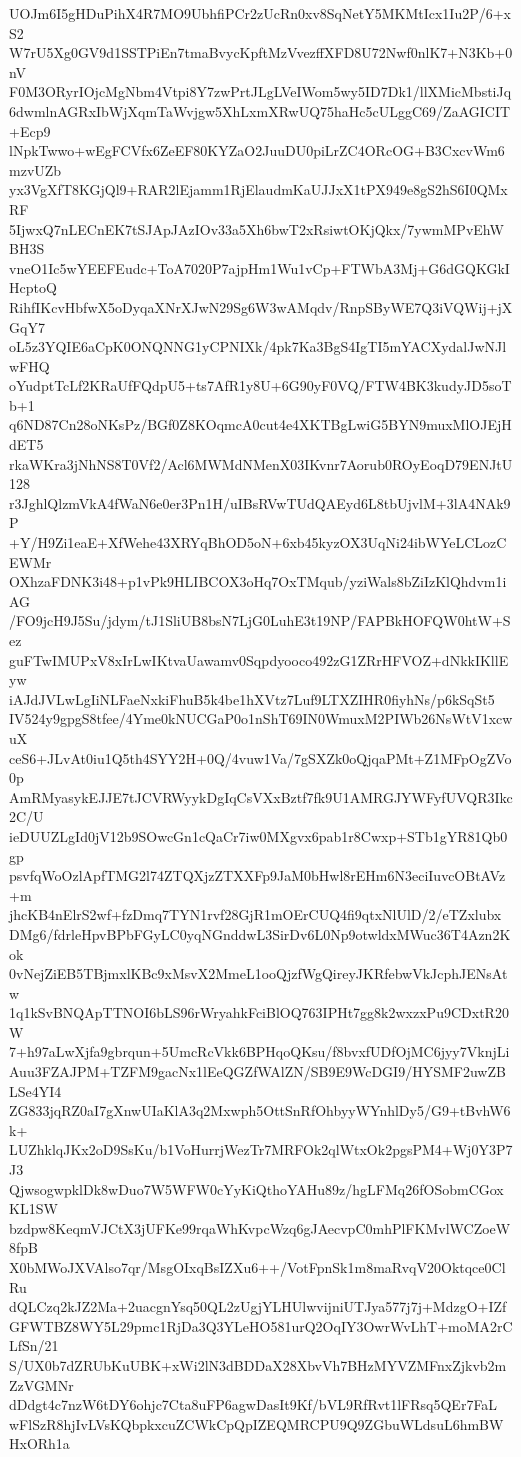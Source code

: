 UOJm6I5gHDuPihX4R7MO9UbhfiPCr2zUcRn0xv8SqNetY5MKMtIcx1Iu2P/6+xS2
W7rU5Xg0GV9d1SSTPiEn7tmaBvycKpftMzVvezffXFD8U72Nwf0nlK7+N3Kb+0nV
F0M3ORyrIOjcMgNbm4Vtpi8Y7zwPrtJLgLVeIWom5wy5ID7Dk1/llXMicMbstiJq
6dwmlnAGRxIbWjXqmTaWvjgw5XhLxmXRwUQ75haHc5cULggC69/ZaAGICIT+Ecp9
lNpkTwwo+wEgFCVfx6ZeEF80KYZaO2JuuDU0piLrZC4ORcOG+B3CxcvWm6mzvUZb
yx3VgXfT8KGjQl9+RAR2lEjamm1RjElaudmKaUJJxX1tPX949e8gS2hS6I0QMxRF
5IjwxQ7nLECnEK7tSJApJAzIOv33a5Xh6bwT2xRsiwtOKjQkx/7ywmMPvEhWBH3S
vneO1Ic5wYEEFEudc+ToA7020P7ajpHm1Wu1vCp+FTWbA3Mj+G6dGQKGkIHcptoQ
RihfIKcvHbfwX5oDyqaXNrXJwN29Sg6W3wAMqdv/RnpSByWE7Q3iVQWij+jXGqY7
oL5z3YQIE6aCpK0ONQNNG1yCPNIXk/4pk7Ka3BgS4IgTI5mYACXydalJwNJlwFHQ
oYudptTcLf2KRaUfFQdpU5+ts7AfR1y8U+6G90yF0VQ/FTW4BK3kudyJD5soTb+1
q6ND87Cn28oNKsPz/BGf0Z8KOqmcA0cut4e4XKTBgLwiG5BYN9muxMlOJEjHdET5
rkaWKra3jNhNS8T0Vf2/Acl6MWMdNMenX03IKvnr7Aorub0ROyEoqD79ENJtU128
r3JghlQlzmVkA4fWaN6e0er3Pn1H/uIBsRVwTUdQAEyd6L8tbUjvlM+3lA4NAk9P
+Y/H9Zi1eaE+XfWehe43XRYqBhOD5oN+6xb45kyzOX3UqNi24ibWYeLCLozCEWMr
OXhzaFDNK3i48+p1vPk9HLIBCOX3oHq7OxTMqub/yziWals8bZiIzKlQhdvm1iAG
/FO9jcH9J5Su/jdym/tJ1SliUB8bsN7LjG0LuhE3t19NP/FAPBkHOFQW0htW+Sez
guFTwIMUPxV8xIrLwIKtvaUawamv0Sqpdyooco492zG1ZRrHFVOZ+dNkkIKllEyw
iAJdJVLwLgIiNLFaeNxkiFhuB5k4be1hXVtz7Luf9LTXZIHR0fiyhNs/p6kSqSt5
IV524y9gpgS8tfee/4Yme0kNUCGaP0o1nShT69IN0WmuxM2PIWb26NsWtV1xcwuX
ceS6+JLvAt0iu1Q5th4SYY2H+0Q/4vuw1Va/7gSXZk0oQjqaPMt+Z1MFpOgZVo0p
AmRMyasykEJJE7tJCVRWyykDgIqCsVXxBztf7fk9U1AMRGJYWFyfUVQR3Ikc2C/U
ieDUUZLgId0jV12b9SOwcGn1cQaCr7iw0MXgvx6pab1r8Cwxp+STb1gYR81Qb0gp
psvfqWoOzlApfTMG2l74ZTQXjzZTXXFp9JaM0bHwl8rEHm6N3eciIuvcOBtAVz+m
jhcKB4nElrS2wf+fzDmq7TYN1rvf28GjR1mOErCUQ4fi9qtxNlUlD/2/eTZxlubx
DMg6/fdrleHpvBPbFGyLC0yqNGnddwL3SirDv6L0Np9otwldxMWuc36T4Azn2Kok
0vNejZiEB5TBjmxlKBc9xMsvX2MmeL1ooQjzfWgQireyJKRfebwVkJcphJENsAtw
1q1kSvBNQApTTNOI6bLS96rWryahkFciBlOQ763IPHt7gg8k2wxzxPu9CDxtR20W
7+h97aLwXjfa9gbrqun+5UmcRcVkk6BPHqoQKsu/f8bvxfUDfOjMC6jyy7VknjLi
Auu3FZAJPM+TZFM9gacNx1lEeQGZfWAlZN/SB9E9WcDGI9/HYSMF2uwZBLSe4YI4
ZG833jqRZ0aI7gXnwUIaKlA3q2Mxwph5OttSnRfOhbyyWYnhlDy5/G9+tBvhW6k+
LUZhklqJKx2oD9SsKu/b1VoHurrjWezTr7MRFOk2qlWtxOk2pgsPM4+Wj0Y3P7J3
QjwsogwpklDk8wDuo7W5WFW0cYyKiQthoYAHu89z/hgLFMq26fOSobmCGoxKL1SW
bzdpw8KeqmVJCtX3jUFKe99rqaWhKvpcWzq6gJAecvpC0mhPlFKMvlWCZoeW8fpB
X0bMWoJXVAlso7qr/MsgOIxqBsIZXu6++/VotFpnSk1m8maRvqV20Oktqce0ClRu
dQLCzq2kJZ2Ma+2uacgnYsq50QL2zUgjYLHUlwvijniUTJya577j7j+MdzgO+IZf
GFWTBZ8WY5L29pmc1RjDa3Q3YLeHO581urQ2OqIY3OwrWvLhT+moMA2rCLfSn/21
S/UX0b7dZRUbKuUBK+xWi2lN3dBDDaX28XbvVh7BHzMYVZMFnxZjkvb2mZzVGMNr
dDdgt4c7nzW6tDY6ohjc7Cta8uFP6agwDasIt9Kf/bVL9RfRvt1lFRsq5QEr7FaL
wFlSzR8hjIvLVsKQbpkxcuZCWkCpQpIZEQMRCPU9Q9ZGbuWLdsuL6hmBWHxORh1a
